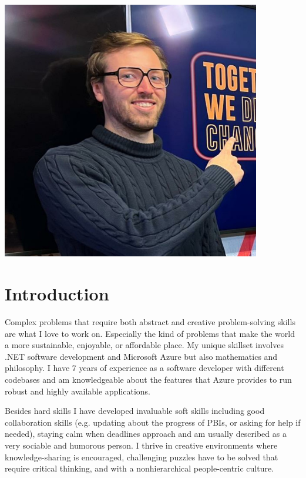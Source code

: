 \documentclass[a4paper,8pt]{article}
\begin{document}
\begin{minipage}{0.25\textwidth}
\hspace*{-2.35cm}
\includegraphics[width=0.85\textwidth]{casper.jpg}
\end{minipage}

\section{Introduction}
Complex problems that require both abstract and creative problem-solving skills are what I love to work on. Especially the kind of problems that make the world a more sustainable, enjoyable, or affordable place. My unique skillset involves .NET software development and Microsoft Azure but also mathematics and philosophy. I have 7 years of experience as a software developer with different codebases and am knowledgeable about the features that Azure provides to run robust and highly available applications. 

\noindent
Besides hard skills I have developed invaluable soft skills including good collaboration skills (e.g. updating about the progress of PBIs, or asking for help if needed), staying calm when deadlines approach and am usually described as a very sociable and humorous person. I thrive in creative environments where knowledge-sharing is encouraged, challenging puzzles have to be solved that require critical thinking, and with a nonhierarchical people-centric culture. 
\end{document}
